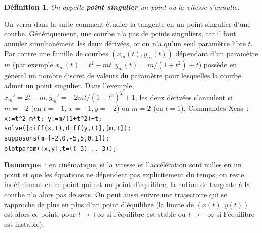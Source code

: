 \documentclass[a4paper,11pt]{article}
\newtheorem{defn}[thm]{D\'efinition}
\begin{document}
\begin{giacjshere}
\begin{defn}
On appelle {\bf point singulier} 
un point o\`u la vitesse s'annulle.
\end{defn}
On verra dans la suite comment \'etudier la tangente en un point
singulier d'une courbe. G\'en\'eriquement, une courbe n'a pas
de points singuliers, car il faut annuler simultan\'ement les
deux d\'eriv\'ees, or on n'a qu'un seul param\`etre libre $t$. Par contre
une famille de courbes $(x_m(t),y_m(t))$ d\'ependant d'un param\`etre
$m$ (par exemple $x_m(t)=t^2-mt, y_m(t)=m/(1+t^2)+t$)
poss\`ede en g\'en\'eral un nombre discret de valeurs du
param\`etre pour lesquelles la courbe admet un point singulier.
Dans l'exemple, $x_m'=2t-m, y_m'=-2mt/(1+t^2)^2+1$, les deux 
d\'eriv\'ees s'annulent si $m=-2$ 
(en $t=-1$, $x=-1, y=-2$) ou $m=2$ (en $t=1$).
Commandes Xcas~:\\
\verb|x:=t^2-m*t; y:=m/(1+t^2)+t;|\\
\verb|solve([diff(x,t),diff(y,t)],[m,t]);|\\
\verb|supposons(m=[-2.0,-5,5,0.1]);| \\
\verb|plotparam([x,y],t=((-3) .. 3));|\\

{\bf Remarque~}: en cin\'ematique, si la vitesse et l'acc\'el\'eration
sont nulles en un point
et que les \'equations ne d\'ependent pas explicitement du temps,
on reste ind\'efiniment en ce point qui est un point d'\'equilibre,
la notion de tangente \`a la courbe n'a alors pas de sens.
On peut aussi suivre une trajectoire qui se rapproche 
de plus en plus d'un point d'\'equilibre (la limite de $(x(t),y(t))$
est alors ce point, pour $t \rightarrow +\infty$ si l'\'equilibre
est stable ou $t \rightarrow - \infty$ si l'\'equilibre est instable).


\end{giacjshere}
\end{document}
